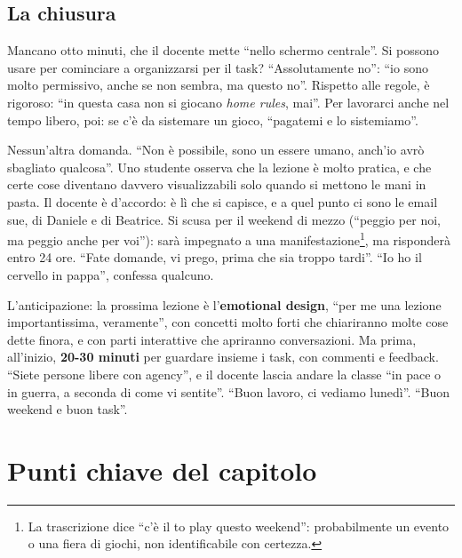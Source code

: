 \subsection{La chiusura}

Mancano otto minuti, che il docente mette ``nello schermo centrale''. Si possono usare
per cominciare a organizzarsi per il task? ``Assolutamente no'': ``io sono molto
permissivo, anche se non sembra, ma questo no''. Rispetto alle regole, è rigoroso:
``in questa casa non si giocano \emph{home rules}, mai''. Per lavorarci anche nel
tempo libero, poi: se c'è da sistemare un gioco, ``pagatemi e lo sistemiamo''.

Nessun'altra domanda. ``Non è possibile, sono un essere umano, anch'io avrò sbagliato
qualcosa''. Uno studente osserva che la lezione è molto pratica, e che certe cose
diventano davvero visualizzabili solo quando si mettono le mani in pasta. Il docente
è d'accordo: è lì che si capisce, e a quel punto ci sono le email sue, di Daniele e
di Beatrice. Si scusa per il weekend di mezzo (``peggio per noi, ma peggio anche per
voi''): sarà impegnato a una manifestazione\footnote{La trascrizione dice ``c'è il to
play questo weekend'': probabilmente un evento o una fiera di giochi, non
identificabile con certezza.}, ma risponderà entro 24 ore. ``Fate domande, vi
prego, prima che sia troppo tardi''. ``Io ho il cervello in pappa'', confessa
qualcuno.

L'anticipazione: la prossima lezione è l'\textbf{emotional design}, ``per me una
lezione importantissima, veramente'', con concetti molto forti che chiariranno molte
cose dette finora, e con parti interattive che apriranno conversazioni. Ma prima,
all'inizio, \textbf{20-30 minuti} per guardare insieme i task, con commenti e
feedback. ``Siete persone libere con agency'', e il docente lascia andare la classe
``in pace o in guerra, a seconda di come vi sentite''. ``Buon lavoro, ci vediamo
lunedì''. ``Buon weekend e buon task''.

\section*{Punti chiave del capitolo}

